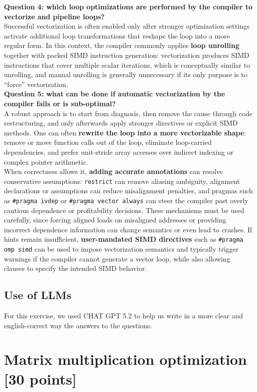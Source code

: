 \documentclass[unicode,10pt,a4paper,oneside,numbers=endperiod,openany]{scrartcl}
\begin{document}
\textbf{Question 4: which loop optimizations are performed by the compiler to vectorize and pipeline loops?}\\
Successful vectorization is often enabled only after stronger optimization settings activate additional loop transformations that reshape the loop into a more regular form. In this context, the compiler commonly applies \textbf{loop unrolling} together with packed SIMD instruction generation: vectorization produces SIMD instructions that cover multiple scalar iterations, which is conceptually similar to unrolling, and manual unrolling is generally unnecessary if its only purpose is to ``force'' vectorization.\\

\textbf{Question 5: what can be done if automatic vectorization by the compiler fails or is sub-optimal?}\\
A robust approach is to start from diagnosis, then remove the cause through code restructuring, and only afterwards apply stronger directives or explicit SIMD methods. One can often \textbf{rewrite the loop into a more vectorizable shape}: remove or move function calls out of the loop, eliminate loop-carried dependencies, and prefer unit-stride array accesses over indirect indexing or complex pointer arithmetic.\\
When correctness allows it, \textbf{adding accurate annotations} can resolve conservative assumptions: \texttt{restrict} can remove aliasing ambiguity, alignment declarations or assumptions can reduce misalignment penalties, and pragmas such as \texttt{\#pragma ivdep} or \texttt{\#pragma vector always} can steer the compiler past overly cautious dependence or profitability decisions. These mechanisms must be used carefully, since forcing aligned loads on misaligned addresses or providing incorrect dependence information can change semantics or even lead to crashes. If hints remain insufficient, \textbf{user-mandated SIMD directives} such as \texttt{\#pragma omp simd} can be used to impose vectorization semantics and typically trigger warnings if the compiler cannot generate a vector loop, while also allowing clauses to specify the intended SIMD behavior.
\subsection{Use of LLMs}
For this exercise, we used CHAT GPT 5.2 to help us write in a more clear and english-correct way the answers to the questions.\\
\newpage
\section{Matrix multiplication optimization [30 points]}
\end{document}

